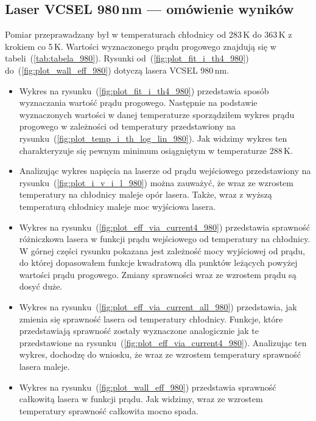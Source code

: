 \subsection{Laser VCSEL 980\,nm --- omówienie wyników}
Pomiar przeprawadzany był w temperaturach chłodnicy od 283\,K do 363\,K z krokiem co 5\,K. Wartości wyznaczonego prądu progowego
znajdują się w tabeli~(\ref{tab:tabela_980}). Rysunki od~(\ref{fig:plot_fit_i_th4_980}) do~(\ref{fig:plot_wall_eff_980}) dotyczą lasera
VCSEL 980\,nm.
\begin{itemize}
\item Wykres na rysunku~(\ref{fig:plot_fit_i_th4_980}) przedstawia sposób wyznaczania wartość prądu progowego. Następnie na podstawie
wyznaczonych wartości w danej temperaturze sporządziłem wykres prądu progowego w zależności od temperatury
przedstawiony na rysunku~(\ref{fig:plot_temp_i_th_log_lin_980}). Jak widzimy wykres ten charakteryzuje się pewnym
minimum osiągniętym w temperaturze 288\,K.
\item Analizując wykres napięcia na laserze od prądu wejściowego przedstawiony na rysunku~(\ref{fig:plot_i_v_i_l_980})
można zauważyć, że wraz ze wzrostem temperatury na chłodnicy
maleje opór lasera. Także, wraz z wyższą temperaturą chłodnicy maleje moc wyjściowa lasera.
\item Wykres na rysunku~(\ref{fig:plot_eff_via_current4_980}) przedstawia sprawność różniczkowa lasera w funkcji prądu wejściowego
od temperatury na chłodnicy. W górnej części rysunku pokazana jest zależność mocy wyjściowej od prądu, do której dopasowałem
funkcje kwadratową dla punktów leżących powyżej wartości prądu progowego. Zmiany sprawności wraz ze wzrostem prądu są dosyć duże.
\item Wykres na rysunku~(\ref{fig:plot_eff_via_current_all_980}) przedstawia, jak zmienia się sprawność lasera od temperatury chłodnicy.
Funkcje, które przedstawiają sprawność zostały wyznaczone analogicznie jak te przedstawione na rysunku~(\ref{fig:plot_eff_via_current4_980}).
Analizując ten wykres, dochodzę do wniosku, że wraz ze wzrostem temperatury sprawność lasera maleje.
\item Wykres na rysunku~(\ref{fig:plot_wall_eff_980}) przedstawia sprawność całkowitą lasera w funkcji prądu. Jak widzimy,
wraz ze wzrostem temperatury sprawność całkowita mocno spada.
\end{itemize}

